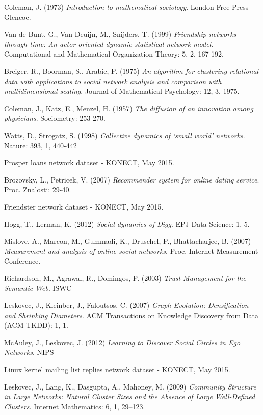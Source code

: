 \documentclass[3p,times]{elsarticle}
\begin{document}
\begin{enumerate}
\begin{thebibliography}{9}
	Coleman, J. (1973)
	\textit{Introduction to mathematical sociology}.
	London Free Press Glencoe.
	
	Van de Bunt, G., Van Deuijn, M., Snijders, T. (1999)
	\textit{Friendship networks through time: An actor-oriented dynamic statistical network model}.
	Computational and Mathematical Organization Theory: 5, 2, 167-192.
	
	Breiger, R., Boorman, S., Arabie, P. (1975)
	\textit{An algorithm for clustering relational data with applications to social network analysis and comparison with multidimensional scaling}.
	Journal of Mathematical Psychology: 12, 3, 1975.
	
	Coleman, J., Katz, E., Menzel, H. (1957)
	\textit{The diffusion of an innovation among physicians}.
	Sociometry: 253-270.
	
	Watts, D., Strogatz, S. (1998)
	\textit{Collective dynamics of `small world' networks}.
	Nature: 393, 1, 440-442
	
	Prosper loans network dataset - KONECT, May 2015.
	
	Brozovsky, L., Petricek, V. (2007)
	\textit{Recommender system for online dating service}.
	Proc. Znalosti: 29-40.
	
	Friendster network dataset - KONECT, May 2015.
	
	Hogg, T., Lerman, K. (2012)
	\textit{Social dynamics of Digg}.
	EPJ Data Science: 1, 5.
	
	Mislove, A., Marcon, M., Gummadi, K., Druschel, P., Bhattacharjee, B. (2007)
	\textit{Measurement and analysis of online social networks}.
	Proc. Internet Measurement Conference.
	
	Richardson, M., Agrawal, R., Domingos, P. (2003)
	\textit{Trust Management for the Semantic Web}.
	ISWC
	
	Leskovec, J., Kleinber, J., Faloutsos, C. (2007)
	\textit{Graph Evolution: Densification and Shrinking Diameters}.
	ACM Transactions on Knowledge Discovery from Data (ACM TKDD): 1, 1.
	
	McAuley, J., Leskovec, J. (2012)
	\textit{Learning to Discover Social Circles in Ego Networks}.
	NIPS
	
	Linux kernel mailing list replies network dataset - KONECT, May 2015.
	
	Leskovec, J., Lang, K., Dasgupta, A., Mahoney, M. (2009)
	\textit{Community Structure in Large Networks: Natural Cluster Sizes and the Absence of Large Well-Defined Clusters}.
	Internet Mathematics: 6, 1, 29--123.
	

\end{thebibliography}
\end{enumerate}
\end{document}
